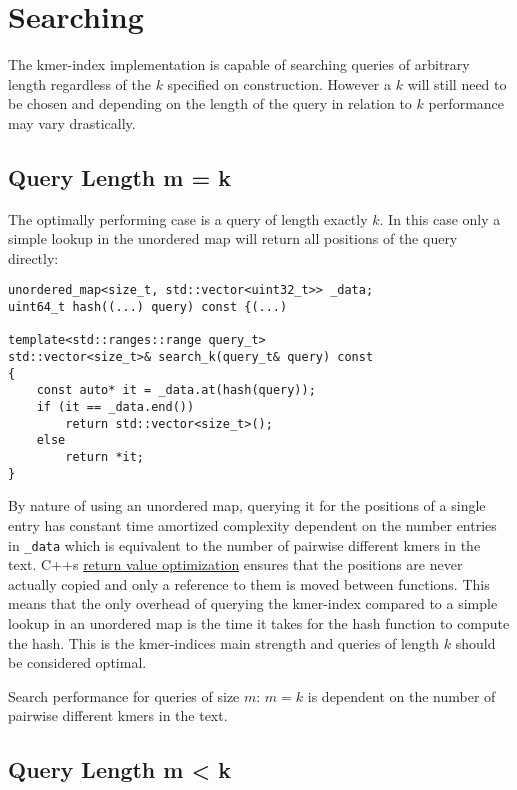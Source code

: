 \section{Searching}

The kmer-index implementation is capable of searching queries of arbitrary length regardless of the $k$ specified on
construction. However a $k$ will still need to be chosen and depending on the length of the query in relation to $k$
performance may vary drastically.

\subsection{Query Length m = k}

The optimally performing case is a query of length exactly $k$. In this case only a simple lookup in the unordered map will
return all positions of the query directly:
\begin{lstlisting}[caption={Search function for queries of size k.},language={[GNU]C++},tabsize=4]
unordered_map<size_t, std::vector<uint32_t>> _data;
uint64_t hash((...) query) const {(...)

template<std::ranges::range query_t>
std::vector<size_t>& search_k(query_t& query) const
{
	const auto* it = _data.at(hash(query));
	if (it == _data.end())
		return std::vector<size_t>();
	else
		return *it;
}
\end{lstlisting}

By nature of using an unordered map, querying it for the positions of a single entry has constant time amortized complexity
dependent on the number entries in \lstinline{_data} which is equivalent to the number of pairwise different kmers in the text. C++s
\href{https://en.cppreference.com/w/cpp/language/copy_elision}{return value optimization} ensures that the positions are
never actually copied and only a reference to them is moved between functions. This means that the only overhead of querying
the kmer-index compared to a simple lookup in an unordered map is the time it takes for the hash function
to compute the hash. This is the kmer-indices main strength and queries of length $k$ should be considered optimal.

\begin{lem}
\label{Lemma 1}
Search performance for queries of size $m:\,m=k$ is dependent on the number of pairwise different kmers in the text.
\end{lem}
\newpage
\subsection{Query Length m < k}

